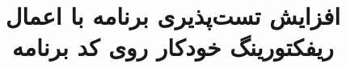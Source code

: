 \subject{مهندسی کامپیوتر}
\title{افزایش تست‌پذیری برنامه با اعمال ریفکتورینگ خودکار روی کد برنامه}


\firstPage
\besmPage
\davaranPage

